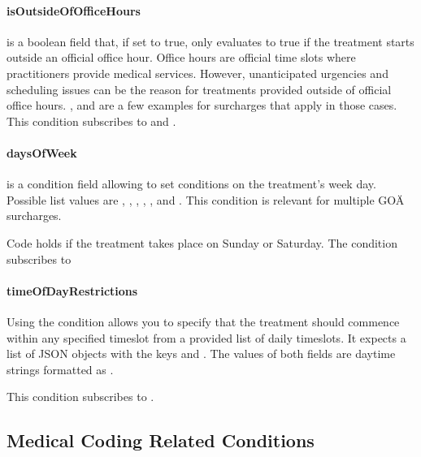 \paragraph{isOutsideOfOfficeHours}
 is a boolean field that, if set to true, only evaluates to true if the treatment starts outside an official office hour.
Office hours are official time slots where practitioners provide medical services.
However, unanticipated urgencies and scheduling issues can be the reason for treatments provided outside of official office hours.
,  and  are a few examples for surcharges that apply in those cases.
This condition subscribes to  and .

\paragraph{daysOfWeek}
\daysOfWeek is a condition field allowing to set conditions on the treatment's week day.
Possible list values are , , , , ,  and .
This condition is relevant for multiple GOÄ surcharges.

Code  holds if the treatment takes place on Sunday or Saturday.
The \daysOfWeek condition subscribes to 

\paragraph{timeOfDayRestrictions}
Using the  condition allows you to specify that the treatment should commence within any specified timeslot from a provided list of daily timeslots.
It expects a list of JSON objects with the keys  and .
The values of both fields are daytime strings formatted as .

This condition subscribes to .

\subsection{Medical Coding Related Conditions}\label{subsec:medical-coding-related-conditions}

